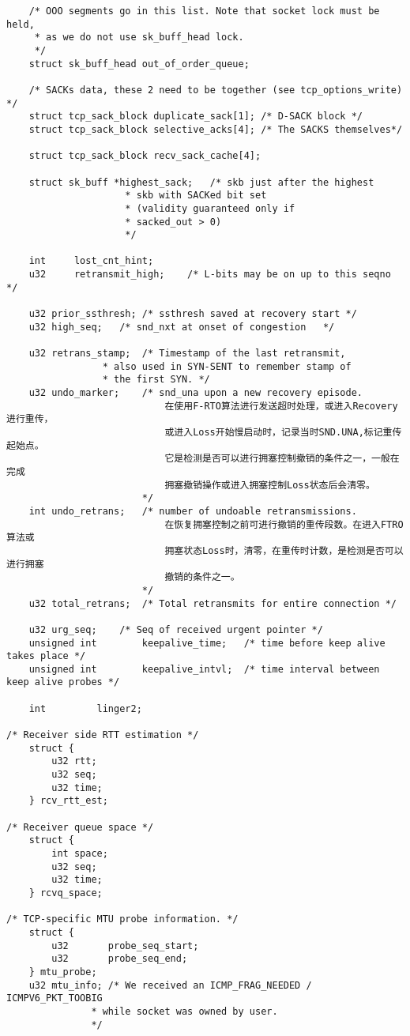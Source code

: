 \begin{verbatim}
    /* OOO segments go in this list. Note that socket lock must be held,
     * as we do not use sk_buff_head lock.
     */
    struct sk_buff_head out_of_order_queue;

    /* SACKs data, these 2 need to be together (see tcp_options_write) */
    struct tcp_sack_block duplicate_sack[1]; /* D-SACK block */
    struct tcp_sack_block selective_acks[4]; /* The SACKS themselves*/

    struct tcp_sack_block recv_sack_cache[4];

    struct sk_buff *highest_sack;   /* skb just after the highest
                     * skb with SACKed bit set
                     * (validity guaranteed only if
                     * sacked_out > 0)
                     */

    int     lost_cnt_hint;
    u32     retransmit_high;    /* L-bits may be on up to this seqno */

    u32 prior_ssthresh; /* ssthresh saved at recovery start */
    u32 high_seq;   /* snd_nxt at onset of congestion   */

    u32 retrans_stamp;  /* Timestamp of the last retransmit,
                 * also used in SYN-SENT to remember stamp of
                 * the first SYN. */
    u32 undo_marker;    /* snd_una upon a new recovery episode. 
							在使用F-RTO算法进行发送超时处理，或进入Recovery进行重传，
							或进入Loss开始慢启动时，记录当时SND.UNA,标记重传起始点。
							它是检测是否可以进行拥塞控制撤销的条件之一，一般在完成
							拥塞撤销操作或进入拥塞控制Loss状态后会清零。
						*/
    int undo_retrans;   /* number of undoable retransmissions. 
							在恢复拥塞控制之前可进行撤销的重传段数。在进入FTRO算法或
							拥塞状态Loss时，清零，在重传时计数，是检测是否可以进行拥塞
							撤销的条件之一。
						*/
    u32 total_retrans;  /* Total retransmits for entire connection */

    u32 urg_seq;    /* Seq of received urgent pointer */
    unsigned int        keepalive_time;   /* time before keep alive takes place */
    unsigned int        keepalive_intvl;  /* time interval between keep alive probes */

    int         linger2;

/* Receiver side RTT estimation */
    struct {
        u32 rtt;
        u32 seq;
        u32 time;
    } rcv_rtt_est;

/* Receiver queue space */
    struct {
        int space;
        u32 seq;
        u32 time;
    } rcvq_space;

/* TCP-specific MTU probe information. */
    struct {
        u32       probe_seq_start;
        u32       probe_seq_end;
    } mtu_probe;
    u32 mtu_info; /* We received an ICMP_FRAG_NEEDED / ICMPV6_PKT_TOOBIG
               * while socket was owned by user.
               */


\end{verbatim}
